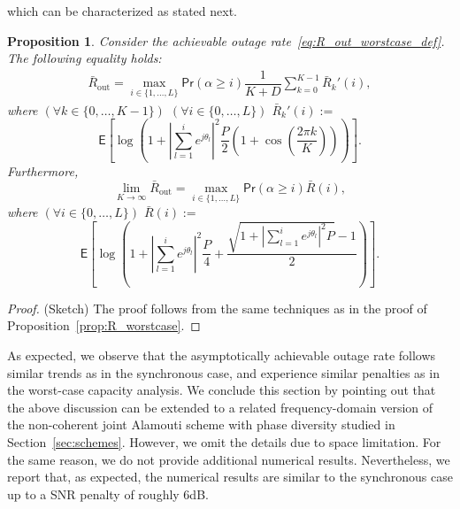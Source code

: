 \documentclass[10pt,journal,a4paper]{IEEEtran}
\newcommand{\eqdef}{:=}
\newcommand{\E}{\mathsf{E}}		%
\renewcommand{\P}{\mathsf{Pr}} 			%
\newtheorem{proposition}{Proposition}
\begin{document}
which can be characterized as stated next.
\begin{proposition}\label{prop:R_out_worstcase}
Consider the achievable outage rate~\eqref{eq:R_out_worstcase_def}. The following equality holds:
\begin{equation*}
\begin{split}
\bar{R}_{\mathrm{out}}= \max_{i\in\{1,\ldots,L\}} \P(\alpha \geq i)\dfrac{1}{K+D}\sum_{k=0}^{K-1}\bar{R}_k'(i),
\end{split}
\end{equation*}
where $(\forall k \in \{0,\ldots,K-1\})$ $(\forall i \in\{0,\ldots,L\})$ $\bar{R}_k'(i) \eqdef $
\begin{equation*}
\E\left[\log\left(1+\left|\textstyle\sum_{l=1}^ie^{j\theta_l}\right|^2\frac{P}{2}\left(1+\cos\left(\frac{2\pi k}{K}\right)\right)\right)\right].
\end{equation*}
Furthermore, 
\begin{equation*}
\lim_{K\to \infty} \bar{R}_{\mathrm{out}} = \max_{i\in\{1,\ldots,L\}}\P(\alpha \geq i)\bar{R}(i),
\end{equation*}
where $(\forall i\in \{0,\ldots,L\})$ $\bar{R}(i) \eqdef $
\begin{equation*}
\E\left[\log\left(1+\left|\sum_{l=1}^ie^{j\theta_l}\right|^2 \frac{P}{4}+\frac{\sqrt{1+\left|\sum_{l=1}^ie^{j\theta_l}\right|^2 P}-1}{2}\right)\right].
\end{equation*}
\end{proposition}
\begin{proof}
(Sketch) The proof follows from the same techniques as in the proof of Proposition~\ref{prop:R_worstcase}.
\end{proof}
As expected, we observe that the asymptotically achievable outage rate follows similar trends as in the synchronous case, and experience similar penalties as in the worst-case capacity analysis. We conclude this section by pointing out that the above discussion can be extended to a related frequency-domain version of the non-coherent joint Alamouti scheme with phase diversity studied in Section~\ref{sec:schemes}. However, we omit the details due to space limitation. For the same reason, we do not provide additional numerical results. Nevertheless, we report that, as expected, the numerical results are similar to the synchronous case up to a SNR penalty of roughly 6dB.
\end{document}
